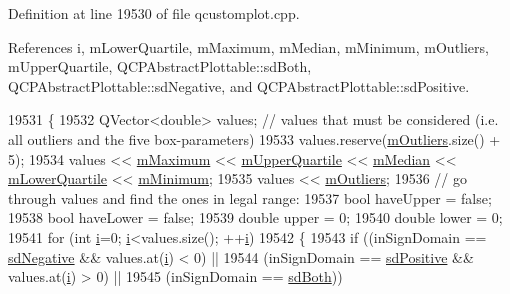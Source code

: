 Definition at line 19530 of file qcustomplot.\+cpp.



References i, m\+Lower\+Quartile, m\+Maximum, m\+Median, m\+Minimum, m\+Outliers, m\+Upper\+Quartile, Q\+C\+P\+Abstract\+Plottable\+::sd\+Both, Q\+C\+P\+Abstract\+Plottable\+::sd\+Negative, and Q\+C\+P\+Abstract\+Plottable\+::sd\+Positive.


\begin{DoxyCode}
19531 \{
19532   QVector<double> values; \textcolor{comment}{// values that must be considered (i.e. all outliers and the five box-parameters)}
19533   values.reserve(\hyperlink{class_q_c_p_statistical_box_a415e2f77a89396c2af999afe027bdf6c}{mOutliers}.size() + 5);
19534   values << \hyperlink{class_q_c_p_statistical_box_a16266f1e0e4e8e95b5d141c49479ef2e}{mMaximum} << \hyperlink{class_q_c_p_statistical_box_a865afbcca332ee851aa45807381bc80e}{mUpperQuartile} << \hyperlink{class_q_c_p_statistical_box_ae43287ca13c8166bde2ac19bf0969d23}{mMedian} << 
      \hyperlink{class_q_c_p_statistical_box_acac86cac93d9fa3d820b5aaa04ed96f6}{mLowerQuartile} << \hyperlink{class_q_c_p_statistical_box_a7143ece4e7e5f9ac010739fbc390bf0c}{mMinimum};
19535   values << \hyperlink{class_q_c_p_statistical_box_a415e2f77a89396c2af999afe027bdf6c}{mOutliers};
19536   \textcolor{comment}{// go through values and find the ones in legal range:}
19537   \textcolor{keywordtype}{bool} haveUpper = \textcolor{keyword}{false};
19538   \textcolor{keywordtype}{bool} haveLower = \textcolor{keyword}{false};
19539   \textcolor{keywordtype}{double} upper = 0;
19540   \textcolor{keywordtype}{double} lower = 0;
19541   \textcolor{keywordflow}{for} (\textcolor{keywordtype}{int} \hyperlink{_comparision_pictures_2_createtest_image_8m_a6f6ccfcf58b31cb6412107d9d5281426}{i}=0; \hyperlink{_comparision_pictures_2_createtest_image_8m_a6f6ccfcf58b31cb6412107d9d5281426}{i}<values.size(); ++\hyperlink{_comparision_pictures_2_createtest_image_8m_a6f6ccfcf58b31cb6412107d9d5281426}{i})
19542   \{
19543     \textcolor{keywordflow}{if} ((inSignDomain == \hyperlink{class_q_c_p_abstract_plottable_a661743478a1d3c09d28ec2711d7653d8a0fc9a70796ef60ad18ddd18056e6dc63}{sdNegative} && values.at(\hyperlink{_comparision_pictures_2_createtest_image_8m_a6f6ccfcf58b31cb6412107d9d5281426}{i}) < 0) ||
19544         (inSignDomain == \hyperlink{class_q_c_p_abstract_plottable_a661743478a1d3c09d28ec2711d7653d8a02951859f243a4d24e779cfbb5471030}{sdPositive} && values.at(\hyperlink{_comparision_pictures_2_createtest_image_8m_a6f6ccfcf58b31cb6412107d9d5281426}{i}) > 0) ||
19545         (inSignDomain == \hyperlink{class_q_c_p_abstract_plottable_a661743478a1d3c09d28ec2711d7653d8a082b98cfb91a7363a3b5cd17b0c1cd60}{sdBoth}))

\end{DoxyCode}
